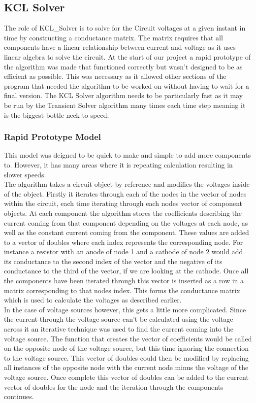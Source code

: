 \documentclass{article}
\begin{document}
\subsection{KCL Solver}
The role of KCL\_Solver is to solve for the Circuit voltages at a given instant in time by constructing a conductance matrix. The matrix requires that all components have a linear relationship between current and voltage as it uses linear algebra to solve the circuit. At the start of our project a rapid prototype of the algorithm was made that functioned correctly but wasn't designed to be as efficient as possible. This was necessary as it allowed other sections of the program that needed the algorithm to be worked on without having to wait for a final version. The KCL Solver algorithm needs to be particularly fast as it may be run by the Transient Solver algorithm many times each time step meaning it is the biggest bottle neck to speed.
\subsubsection{Rapid Prototype Model}
This model was deigned to be quick to make and simple to add more components to. However, it has many areas where it is repeating calculation resulting in slower speeds.\\ The algorithm takes a circuit object by reference and modifies the voltages inside of the object. Firstly it iterates through each of the nodes in the vector of nodes within the circuit, each time iterating through each nodes vector of component objects. At each component the algorithm stores the coefficients describing the current coming from that component depending on the voltages at each node, as well as the constant current coming from the component. These values are added to a vector of doubles where each index represents the corresponding node. For instance a resistor with an anode of node 1 and a cathode of node 2 would add its conductance to the second index of the vector and the negative of its conductance to the third of the vector, if we are looking at the cathode. Once all the components have been iterated through this vector is inserted as a row in a matrix corresponding to that nodes index. This forms the conductance matrix which is used to calculate the voltages as described earlier.\\
In the case of voltage sources however, this gets a little more complicated. Since the current through the voltage source can't be calculated using the voltage across it an iterative technique was used to find the current coming into the voltage source. The function that creates the vector of coefficients would be called on the opposite node of the voltage source, but this time ignoring the connection to the voltage source. This vector of doubles could then be modified by replacing all instances of the opposite node with the current node minus the voltage of the voltage source. Once complete this vector of doubles can be added to the current vector of doubles for the node and the iteration through the components continues. 
\end{document}
